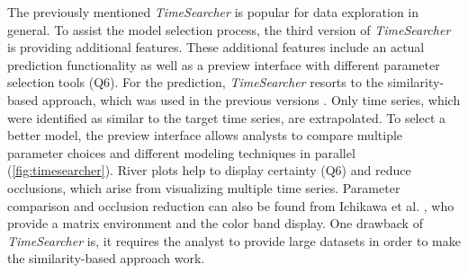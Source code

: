 \documentclass[electronic]{vgtc}             %
\begin{document}
The previously mentioned \textit{TimeSearcher} \cite{Hochheiser:2004, buono:2005} is popular for data exploration in general.
To assist the model selection process, the third version of \textit{TimeSearcher} \cite{buono:2007} is providing additional features.  
These additional features include an actual prediction functionality as well as a preview interface with different parameter selection tools (Q6).
For the prediction, \textit{TimeSearcher} resorts to the similarity-based approach, which was used in the previous versions \cite{buono:2005, Hochheiser:2004}.
Only time series, which were identified as similar to the target time series, are extrapolated.
To select a better model, the preview interface allows analysts to compare multiple parameter choices and different modeling techniques in parallel (\autoref{fig:timesearcher}).
River plots help to display certainty (Q6) and reduce occlusions, which arise from visualizing multiple time series.
Parameter comparison and occlusion reduction can also be found from Ichikawa et al. \cite{ichikawa:2002}, who provide a matrix environment and the color band display.
One drawback of \textit{TimeSearcher} is, it requires the analyst to provide large datasets in order to make the similarity-based approach work.
\end{document}
